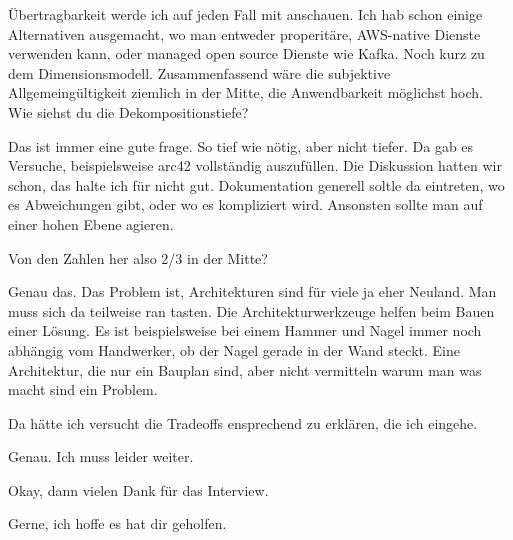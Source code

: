 \LF Übertragbarkeit werde ich auf jeden Fall mit anschauen. Ich hab schon einige Alternativen ausgemacht, wo man entweder properitäre, \ac{AWS}-native Dienste verwenden kann, oder managed open source Dienste wie Kafka. Noch kurz zu dem Dimensionsmodell. Zusammenfassend wäre die subjektive Allgemeingültigkeit ziemlich in der Mitte, die Anwendbarkeit möglichst hoch. Wie siehst du die Dekompositionstiefe?

\RB Das ist immer eine gute frage. So tief wie nötig, aber nicht tiefer. Da gab es Versuche, beispielsweise arc42 vollständig auszufüllen. Die Diskussion hatten wir schon, das halte ich für nicht gut. Dokumentation generell soltle da eintreten, wo es Abweichungen gibt, oder wo es kompliziert wird. Ansonsten sollte man auf einer hohen Ebene agieren.

\LF Von den Zahlen her also 2/3 in der Mitte?

\RB Genau das. Das Problem ist, Architekturen sind für viele ja eher Neuland. Man muss sich da teilweise ran tasten. Die Architekturwerkzeuge helfen beim Bauen einer Lösung. Es ist beispielsweise bei einem Hammer und Nagel immer noch abhängig vom Handwerker, ob der Nagel gerade in der Wand steckt. Eine Architektur, die nur ein Bauplan sind, aber nicht vermitteln warum man was macht sind ein Problem.

\LF Da hätte ich versucht die Tradeoffs ensprechend zu erklären, die ich eingehe.

\RB Genau. Ich muss leider weiter.

\LF Okay, dann vielen Dank für das Interview.

\RB Gerne, ich hoffe es hat dir geholfen.

